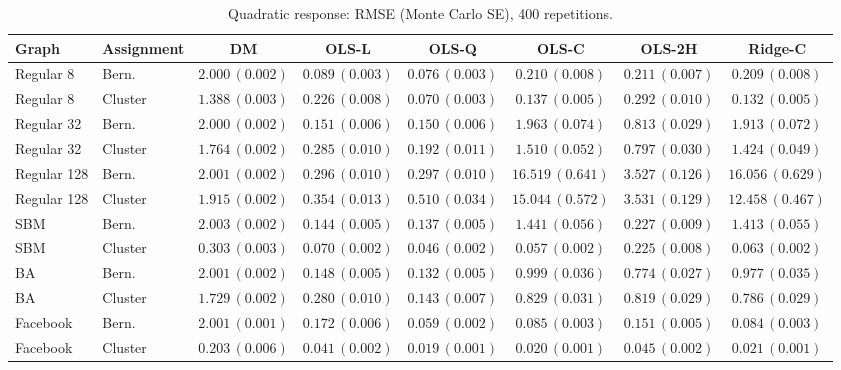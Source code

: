 \begin{table}[t]
\centering\scriptsize
\caption{Quadratic response: RMSE (Monte Carlo SE), 400 repetitions.}
\begin{tabular}{llcccccc}
\toprule
Graph & Assignment & DM & OLS-L & OLS-Q & OLS-C & OLS-2H & Ridge-C \\
\midrule
Regular 8 & Bern. & $2.000\,(0.002)$ & $0.089\,(0.003)$ & $0.076\,(0.003)$ & $0.210\,(0.008)$ & $0.211\,(0.007)$ & $0.209\,(0.008)$ \\
Regular 8 & Cluster & $1.388\,(0.003)$ & $0.226\,(0.008)$ & $0.070\,(0.003)$ & $0.137\,(0.005)$ & $0.292\,(0.010)$ & $0.132\,(0.005)$ \\
Regular 32 & Bern. & $2.000\,(0.002)$ & $0.151\,(0.006)$ & $0.150\,(0.006)$ & $1.963\,(0.074)$ & $0.813\,(0.029)$ & $1.913\,(0.072)$ \\
Regular 32 & Cluster & $1.764\,(0.002)$ & $0.285\,(0.010)$ & $0.192\,(0.011)$ & $1.510\,(0.052)$ & $0.797\,(0.030)$ & $1.424\,(0.049)$ \\
Regular 128 & Bern. & $2.001\,(0.002)$ & $0.296\,(0.010)$ & $0.297\,(0.010)$ & $16.519\,(0.641)$ & $3.527\,(0.126)$ & $16.056\,(0.629)$ \\
Regular 128 & Cluster & $1.915\,(0.002)$ & $0.354\,(0.013)$ & $0.510\,(0.034)$ & $15.044\,(0.572)$ & $3.531\,(0.129)$ & $12.458\,(0.467)$ \\
SBM & Bern. & $2.003\,(0.002)$ & $0.144\,(0.005)$ & $0.137\,(0.005)$ & $1.441\,(0.056)$ & $0.227\,(0.009)$ & $1.413\,(0.055)$ \\
SBM & Cluster & $0.303\,(0.003)$ & $0.070\,(0.002)$ & $0.046\,(0.002)$ & $0.057\,(0.002)$ & $0.225\,(0.008)$ & $0.063\,(0.002)$ \\
BA & Bern. & $2.001\,(0.002)$ & $0.148\,(0.005)$ & $0.132\,(0.005)$ & $0.999\,(0.036)$ & $0.774\,(0.027)$ & $0.977\,(0.035)$ \\
BA & Cluster & $1.729\,(0.002)$ & $0.280\,(0.010)$ & $0.143\,(0.007)$ & $0.829\,(0.031)$ & $0.819\,(0.029)$ & $0.786\,(0.029)$ \\
Facebook & Bern. & $2.001\,(0.001)$ & $0.172\,(0.006)$ & $0.059\,(0.002)$ & $0.085\,(0.003)$ & $0.151\,(0.005)$ & $0.084\,(0.003)$ \\
Facebook & Cluster & $0.203\,(0.006)$ & $0.041\,(0.002)$ & $0.019\,(0.001)$ & $0.020\,(0.001)$ & $0.045\,(0.002)$ & $0.021\,(0.001)$ \\
\bottomrule
\end{tabular}
\end{table}
